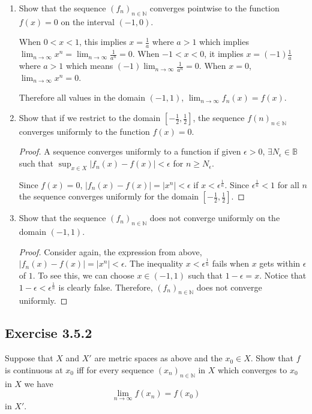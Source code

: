 \documentclass{tufte-book}
\theoremstyle{mytheoremstyle}
\theoremstyle{mylemstyle}
\theoremstyle{mydefstyle}
\begin{document}
\begin{enumerate}

\item Show that the sequence $(f_n)_{n \in \mathbb{N}}$ converges pointwise to the function $f(x) = 0$ on the interval $(-1,0)$.

When $0 < x < 1$, this implies $x = \frac{1}{a}$ where $a > 1$ which implies $\lim_{n \to \infty} x^n = \lim_{n \to \infty} \frac{1}{a^n} = 0$.  When $-1 < x < 0$, it implies $x=(-1)\frac{1}{a}$ where $a > 1$ which means $(-1)\lim_{n \to \infty}\frac{1}{a^n} = 0$.  When $x=0$, $\lim_{n \to \infty} x^n = 0$. 

Therefore all values in the domain $(-1,1)$, $\lim_{n \to \infty}f_n(x) = f(x)$.

\item Show that if we restrict to the domain $[-\frac{1}{2}, \frac{1}{2}]$, the sequence $f(n)_{n \in \mathbb{N}}$ converges uniformly to the function $f(x) = 0$.

\begin{proof}
A sequence converges uniformly to a function if given $\epsilon >0$, $\exists N_\epsilon \in \mathbb{B}$ such that $\sup_{x \in X}|f_n(x) - f(x)| < \epsilon$ for $n \geq N_\epsilon$.

Since $f(x) = 0$, $|f_n(x) - f(x)| = |x^n| < \epsilon$ if $x < \epsilon^\frac{1}{n}$.  Since $\epsilon^\frac{1}{n} < 1$ for all $n$ the sequence converges uniformly for the domain $[-\frac{1}{2}, \frac{1}{2}]$.
\end{proof}

\item Show that the sequence $(f_n)_{n \in \mathbb{N}}$ does not converge uniformly on the domain $(-1,1)$.

\begin{proof}
Consider again, the expression from above, $|f_n(x) - f(x)| = |x^n| < \epsilon$.  The inequality $x < \epsilon^\frac{1}{n}$ fails when $x$ gets within $\epsilon$ of $1$.  To see this, we can choose $x \in (-1,1)$ such that $1-\epsilon = x$. Notice that $1-\epsilon < \epsilon^\frac{1}{n}$ is clearly false.  Therefore, $(f_n)_{n \in \mathbb{N}}$ does not converge uniformly.
\end{proof}

\end{enumerate}


\subsection{Exercise 3.5.2}
Suppose that $X$ and $X'$ are metric spaces as above and the $x_0 \in X$. Show that $f$ is continuous at $x_0$ iff for every sequence $(x_n)_{n \in \mathbb{N}}$ in $X$ which converges to $x_0$ in $X$ we have
\[\lim_{n \to \infty}f(x_n) = f(x_0) \]
in $X'$.
\end{document}
